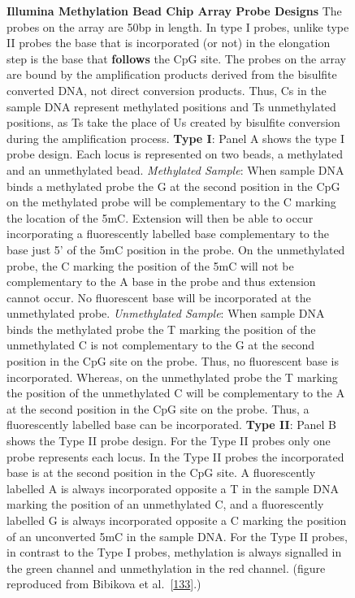 \documentclass[
]{book}
\begin{document}
\begin{figure}
\caption{\textbf{Illumina Methylation Bead Chip Array Probe Designs} The probes on the array are 50bp in length. In type I probes, unlike type II probes the base that is incorporated (or not) in the elongation step is the base that \textbf{follows} the CpG site. The probes on the array are bound by the amplification products derived from the bisulfite converted DNA, not direct conversion products. Thus, Cs in the sample DNA represent methylated positions and Ts unmethylated positions, as Ts take the place of Us created by bisulfite conversion during the amplification process. \textbf{Type I}: Panel A shows the type I probe design. Each locus is represented on two beads, a methylated and an unmethylated bead. \emph{Methylated Sample}: When sample DNA binds a methylated probe the G at the second position in the CpG on the methylated probe will be complementary to the C marking the location of the 5mC. Extension will then be able to occur incorporating a fluorescently labelled base complementary to the base just 5' of the 5mC position in the probe. On the unmethylated probe, the C marking the position of the 5mC will not be complementary to the A base in the probe and thus extension cannot occur. No fluorescent base will be incorporated at the unmethylated probe. \emph{Unmethylated Sample}: When sample DNA binds the methylated probe the T marking the position of the unmethylated C is not complementary to the G at the second position in the CpG site on the probe. Thus, no fluorescent base is incorporated. Whereas, on the unmethylated probe the T marking the position of the unmethylated C will be complementary to the A at the second position in the CpG site on the probe. Thus, a fluorescently labelled base can be incorporated. \textbf{Type II}: Panel B shows the Type II probe design. For the Type II probes only one probe represents each locus. In the Type II probes the incorporated base is at the second position in the CpG site. A fluorescently labelled A is always incorporated opposite a T in the sample DNA marking the position of an unmethylated C, and a fluorescently labelled G is always incorporated opposite a C marking the position of an unconverted 5mC in the sample DNA. For the Type II probes, in contrast to the Type I probes, methylation is always signalled in the green channel and unmethylation in the red channel. (figure reproduced from Bibikova et al.~{[}\protect\hyperlink{ref-Bibikova2011}{133}{]}.)}\label{fig:Bibikova2011IlluminaMethylationBeadChip}
\end{figure}
\end{document}
